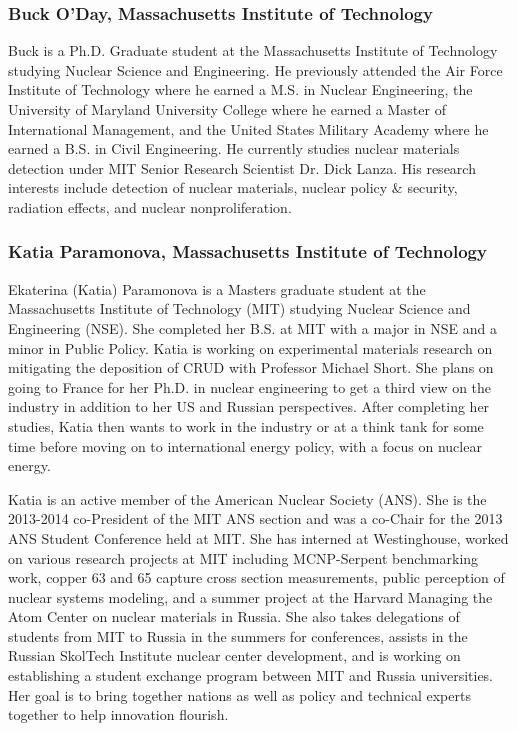 \subsubsection*{Buck O'Day, Massachusetts Institute of Technology}

Buck is a Ph.D. Graduate student at the Massachusetts Institute of Technology
studying Nuclear Science and Engineering. He previously attended the Air Force
Institute of Technology where he earned a M.S. in Nuclear Engineering, the
University of Maryland University College where he earned a Master of
International Management, and the United States Military Academy where he earned
a B.S. in Civil Engineering. He currently studies nuclear materials detection
under MIT Senior Research Scientist Dr. Dick Lanza. His research interests
include detection of nuclear materials, nuclear policy \& security, radiation
effects, and nuclear nonproliferation.

\subsubsection*{Katia Paramonova, Massachusetts Institute of Technology}

Ekaterina (Katia) Paramonova is a Masters graduate student at the Massachusetts
Institute of Technology (MIT) studying Nuclear Science and Engineering
(NSE). She completed her B.S. at MIT with a major in NSE and a minor in Public
Policy. Katia is working on experimental materials research on mitigating the
deposition of CRUD with Professor Michael Short. She plans on going to France
for her Ph.D. in nuclear engineering to get a third view on the industry in
addition to her US and Russian perspectives. After completing her studies, Katia
then wants to work in the industry or at a think tank for some time before
moving on to international energy policy, with a focus on nuclear energy.

Katia is an active member of the American Nuclear Society (ANS). She is the
2013-2014 co-President of the MIT ANS section and was a co-Chair for the 2013
ANS Student Conference held at MIT. She has interned at Westinghouse, worked on
various research projects at MIT including MCNP-Serpent benchmarking work,
copper 63 and 65 capture cross section measurements, public perception of
nuclear systems modeling, and a summer project at the Harvard Managing the Atom
Center on nuclear materials in Russia. She also takes delegations of students
from MIT to Russia in the summers for conferences, assists in the Russian
SkolTech Institute nuclear center development, and is working on establishing a
student exchange program between MIT and Russia universities. Her goal is to
bring together nations as well as policy and technical experts together to help
innovation flourish.

